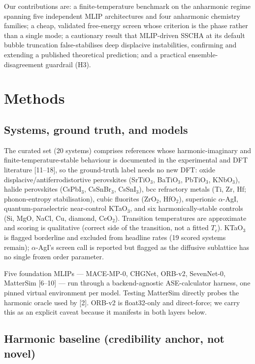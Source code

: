 \documentclass{article}
\begin{document}
Our contributions are: a finite-temperature benchmark on the anharmonic regime spanning five independent MLIP architectures and four anharmonic chemistry families; a cheap, validated free-energy screen whose criterion is the phase rather than a single mode; a cautionary result that MLIP-driven SSCHA at its default bubble truncation false-stabilises deep displacive instabilities, confirming and extending a published theoretical prediction; and a practical ensemble-disagreement guardrail (H3).

\section{Methods}
\label{sec:methods}

\subsection{Systems, ground truth, and models}
\label{sec:systems}

The curated set (20 systems) comprises references whose harmonic-imaginary and finite-temperature-stable behaviour is documented in the experimental and DFT literature [11--18], so the ground-truth label needs no new DFT: oxide displacive/antiferrodistortive perovskites (SrTiO$_3$, BaTiO$_3$, PbTiO$_3$, KNbO$_3$), halide perovskites (CsPbI$_3$, CsSnBr$_3$, CsSnI$_3$), bcc refractory metals (Ti, Zr, Hf; phonon-entropy stabilisation), cubic fluorites (ZrO$_2$, HfO$_2$), superionic $\alpha$-AgI, quantum-paraelectric near-control KTaO$_3$, and six harmonically-stable controls (Si, MgO, NaCl, Cu, diamond, CeO$_2$). Transition temperatures are approximate and scoring is qualitative (correct side of the transition, not a fitted $T_c$). KTaO$_3$ is flagged borderline and excluded from headline rates (19 scored systems remain); $\alpha$-AgI's screen call is reported but flagged as the diffusive sublattice has no single frozen order parameter.

Five foundation MLIPs --- MACE-MP-0, CHGNet, ORB-v2, SevenNet-0, MatterSim [6--10] --- run through a backend-agnostic ASE-calculator harness, one pinned virtual environment per model. Testing MatterSim directly probes the harmonic oracle used by [2]. ORB-v2 is float32-only and direct-force; we carry this as an explicit caveat because it manifests in both layers below.

\subsection{Harmonic baseline (credibility anchor, not novel)}
\label{sec:harmonic}
\end{document}
